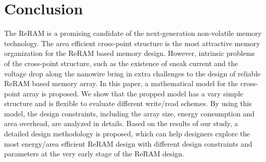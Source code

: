 \vspace{10pt}
\section{Conclusion}\label{sec:conclusion}

The ReRAM is a promising candidate of the next-generation non-volatile memory technology. The area efficient cross-point structure is the most attractive memory organization for the ReRAM based memory design. However, intrinsic problems of the cross-point structure, such as the existence of sneak current and the voltage drop along the nanowire bring in extra challenges to the design of reliable ReRAM based memory array. In this paper, a mathematical model for the cross-point array is proposed. We show that the propped model has a vary simple structure and is flexible to evaluate different write/read schemes. By using this model, the design constraints, including the array size, energy consumption and area overhead, are analyzed in details. Based on the results of our study, a detailed design methodology is proposed, which can help designers explore the most energy/area efficient ReRAM design with different design constraints and parameters at the very early stage of the ReRAM design.  